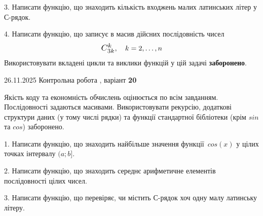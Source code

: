 \documentclass[11pt, ukrainian]{article}
\begin{document}
{{{{{{{{{{{{{{{{{{{\begin {large}

3. Написати функцію, що знаходить кількість входжень малих латинських літер у С-рядок.

\vspace{2mm}


4. 
Написати функцію, що записує в масив дійсних послідовність чисел
$$\scalebox{1.2}{$C_{3k}^{k}$}, \quad k=2,\ldots,n$$
\quad Використовувати вкладені цикли та виклики функцій у цій задачі \textbf{заборонено}.

\vspace{2mm}

\end{large}
\vspace{20mm}


{{26.11.2025 Контрольна робота , варіант  \No \textbf { 20 }\par}}


{
Якість коду та економність обчислень оцінюється по всім завданням. Послідовності задаються масивами. Використовувати рекурсію, додаткові структури даних (у тому числі рядки) та функції стандартної бібліотеки (крім $sin$ та $cos$) заборонено.

\vspace{2mm}

\begin {large}
1. Написати функцію, що знаходить найбільше значення функції~$cos(x)$ у цілих точках інтервалу $(a; b]$.

\vspace{2mm}


2. Написати функцію, що знаходить середнє арифметичне елементів послідовності цілих чисел.

\vspace{2mm}


3. Написати функцію, що перевіряє, чи містить С-рядок хоч одну малу латинську літеру.

\vspace{2mm}



\end{large}}}}}}}}}}}}}}}}}}}}}
\end{document}
